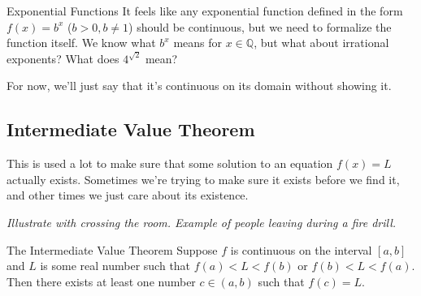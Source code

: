\begin{defn}{Exponential Functions}
  It feels like any exponential function defined in the form $f(x)=b^x$ ($b>0, b\neq1$) should be continuous, but we need to formalize the function itself.
  We know what $b^x$ means for $x\in\mathbb{Q}$, but what about irrational exponents? What does $4^{\sqrt{2}}$ mean?

  For now, we'll just say that it's continuous on its domain without showing it.
\end{defn}

\subsection*{Intermediate Value Theorem}

This is used a lot to make sure that some solution to an equation $f(x)=L$ actually exists.
Sometimes we're trying to make sure it exists before we find it, and other times we just care about its existence.

\textit{Illustrate with crossing the room. Example of people leaving during a fire drill.}

\begin{thm}{The Intermediate Value Theorem}
  Suppose $f$ is continuous on the interval $[a,b]$ and $L$ is some real number such that $f(a)<L<f(b)$ or $f(b)<L<f(a)$.
  Then there exists at least one number $c\in(a,b)$ such that $f(c)=L$.
\end{thm}
